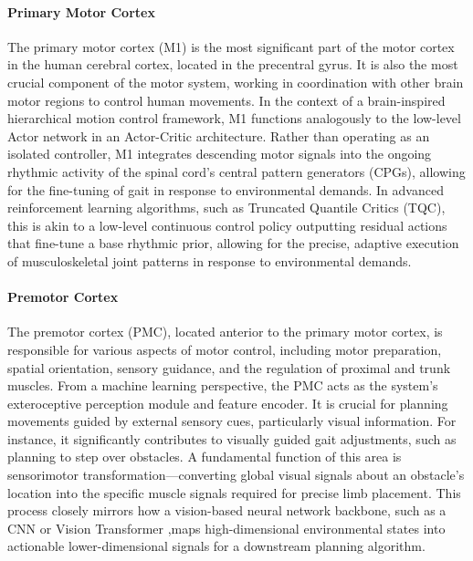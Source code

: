 \documentclass[lettersize,journal]{IEEEtran}
\begin{document}
\paragraph{Primary Motor Cortex} The primary motor cortex (M1) is the most significant part of the motor cortex in the human cerebral cortex, located in the precentral gyrus. 
It is also the most crucial component of the motor system, working in coordination with other brain motor regions to control human movements.
In the context of a brain-inspired hierarchical motion control framework, M1 functions analogously to the low-level Actor network in an Actor-Critic architecture.
Rather than operating as an isolated controller, M1 integrates descending motor signals into the ongoing rhythmic activity of the spinal cord's central pattern generators (CPGs), allowing for the fine-tuning of gait in response to environmental demands.
In advanced reinforcement learning algorithms, such as Truncated Quantile Critics (TQC), this is akin to a low-level continuous control policy outputting residual actions that fine-tune a base rhythmic prior, allowing for the precise, adaptive execution of musculoskeletal joint patterns in response to environmental demands.

\paragraph{Premotor Cortex} The premotor cortex (PMC), located anterior to the primary motor cortex, is responsible for various aspects of motor control, including motor preparation, spatial orientation, sensory guidance, and the regulation of proximal and trunk muscles. 
From a machine learning perspective, the PMC acts as the system's exteroceptive perception module and feature encoder.
It is crucial for planning movements guided by external sensory cues, particularly visual information. 
For instance, it significantly contributes to visually guided gait adjustments, such as planning to step over obstacles. 
A fundamental function of this area is sensorimotor transformation—converting global visual signals about an obstacle's location into the specific muscle signals required for precise limb placement.
This process closely mirrors how a vision-based neural network backbone, such as a CNN or Vision Transformer ,maps high-dimensional environmental states into actionable lower-dimensional signals for a downstream planning algorithm.
\end{document}
